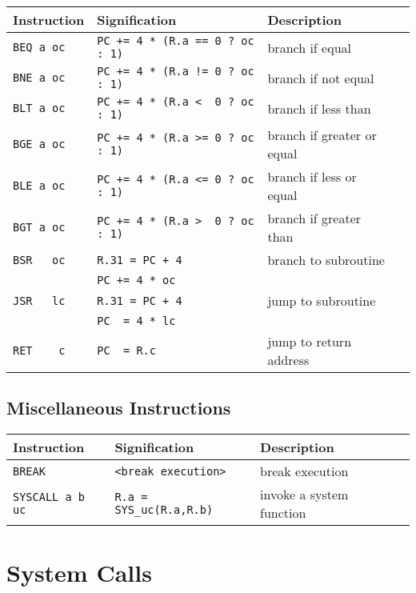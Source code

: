 \documentclass[10pt,a4paper]{article}
\begin{document}
\begin{tabular}{|l|l|l|l|}
\hline
\bf Instruction & \bf Signification & \bf Description \\ \hline \hline
\verb#BEQ a oc# & \verb#PC += 4 * (R.a == 0 ? oc : 1)# & branch if equal            \\ \hline
\verb#BNE a oc# & \verb#PC += 4 * (R.a != 0 ? oc : 1)# & branch if not equal        \\ \hline
\verb#BLT a oc# & \verb#PC += 4 * (R.a <  0 ? oc : 1)# & branch if less than        \\ \hline
\verb#BGE a oc# & \verb#PC += 4 * (R.a >= 0 ? oc : 1)# & branch if greater or equal \\ \hline
\verb#BLE a oc# & \verb#PC += 4 * (R.a <= 0 ? oc : 1)# & branch if less or equal    \\ \hline
\verb#BGT a oc# & \verb#PC += 4 * (R.a >  0 ? oc : 1)# & branch if greater than     \\ \hline
\verb#BSR   oc# & \verb#R.31 = PC + 4                # & branch to subroutine       \\
\verb#        # & \verb#PC += 4 * oc                 # &                            \\ \hline
\verb#JSR   lc# & \verb#R.31 = PC + 4                # & jump to subroutine         \\
\verb#        # & \verb#PC  = 4 * lc                 # &                            \\ \hline
\verb#RET    c# & \verb#PC  = R.c                    # & jump to return address     \\ \hline
\end{tabular}

\subsection{Miscellaneous Instructions}

\begin{tabular}{|l|l|l|l|}
\hline
\bf Instruction & \bf Signification & Description \\ \hline \hline
\verb#BREAK         # & \verb#<break execution># & break execution \\ \hline
\verb#SYSCALL a b uc# & \verb#R.a = SYS_uc(R.a,R.b)# & invoke a system function \\ \hline
\end{tabular}

\section{System Calls}
\end{document}
